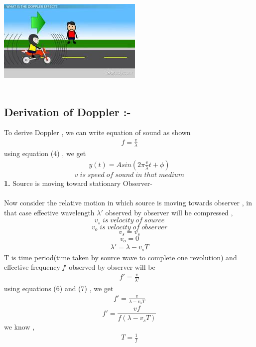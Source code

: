 \documentclass[journal,12pt,twocolumn]{IEEEtran}
\theoremstyle{remark}
\begin{document}
    \includegraphics[width=0.89\linewidth]{figs/doppler.jpg}\\\\

\subsection*{\textbf{Derivation \;of \;Doppler :-}}
To derive Doppler , we can write equation of sound as shown
\begin{align}f = \frac{v}{\lambda}\end{align}
using equation (4) , we get
\begin{align}y(t) = Asin( 2 \pi \frac{v}{\lambda}t + \phi ) \end{align}  
$$v \;is\; speed\; of\; sound\; in\; that\; medium$$
\textbf{1.} Source is moving toward stationary Observer-\\\\
Now consider the relative motion in which source is moving towards observer , in that case effective wavelength $\lambda'$ observed by observer will be compressed ,
$$v_s \;is\; velocity\; of\; source$$
$$v_o \;is\; velocity\; of\;observer $$
$$v_s = v_s$$
$$v_o = 0$$
\begin{align}\lambda' = \lambda - v_s T\end{align}
T is time period(time taken by source wave to complete one revolution)
and effective frequency \textit{f}' observed by observer will be
\begin{align}f' = \frac{v}{\lambda'}\end{align}
using equations (6) and (7) , we get
\begin{align}f' = \frac{v}{\lambda- v_s T}\end{align}
$$f' = \frac{v f}{f(\lambda- v_s T)}$$
we know ,
\begin{align}T = \frac{1}{f}\end{align}
\end{document}
